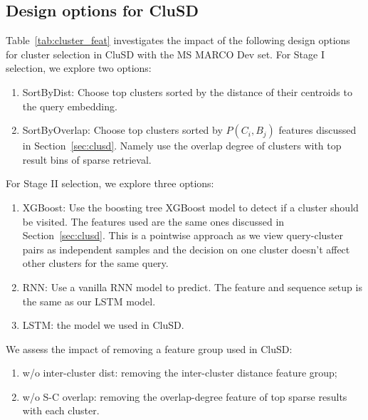 \subsection{Design options for CluSD}
\label{sect:evalLSTM}

Table~\ref{tab:cluster_feat} investigates the impact of the following design options 
for cluster selection in CluSD with  the MS MARCO Dev set. 
For Stage I selection, we explore two options:
\begin{enumerate}
[leftmargin=*]
    \item SortByDist: Choose top clusters sorted by the distance of their  centroids to  the  query embedding.
    \item SortByOverlap:  Choose top  clusters sorted  by $P(C_i, B_j)$ features discussed in Section~\ref{sec:clusd}.
Namely use the overlap degree of clusters with top result bins of sparse retrieval. 
\end{enumerate}

For Stage II selection, we explore three options:
 \begin{enumerate}[leftmargin=*]
    \item XGBoost: Use the boosting tree XGBoost model to detect if a cluster should be visited.
The features used are the same ones discussed in Section~\ref{sec:clusd}. This is a pointwise approach as we view query-cluster pairs as independent samples and the decision on one cluster doesn't affect other clusters for the same query.
    \item RNN: Use a vanilla RNN model to predict. The feature and sequence setup is the same as our LSTM model. 
    \item LSTM: the model we used in CluSD.
\end{enumerate}
    We assess  the impact  of removing a  feature group used in CluSD:
\begin{enumerate}[leftmargin=*]
\item w/o inter-cluster dist: removing  the inter-cluster distance feature group;
\item w/o S-C overlap: removing  the overlap-degree feature of top sparse results with each cluster.
\end{enumerate}


